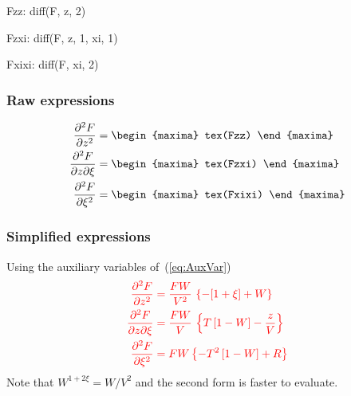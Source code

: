 \begin{maxima}
 Fzz: diff(F, z, 2)
\end{maxima}%

\begin{maxima}
  Fzxi: diff(F, z, 1, xi, 1)
\end{maxima}%

\begin{maxima}
  Fxixi: diff(F, xi, 2) 
\end{maxima}

\begin{landscape}
\subsubsection*{Raw expressions}
  \color{MonVertF}
\begin{align*}
  \frac{\partial^2 F}{\partial z^2}
  &=
    \begin{maxima}
       tex(Fzz)
     \end{maxima} \\
  \frac{\partial^2 F}{\partial z \partial \xi}
  &=
    \begin{maxima}
      tex(Fzxi)
    \end{maxima} \\
  \frac{\partial^2 F}{\partial \xi^2}
  &=
    \begin{maxima}
       tex(Fxixi)
    \end{maxima} \\
\end{align*}
\end{landscape}


\subsubsection*{Simplified expressions}

Using the auxiliary variables of~(\ref{eq:AuxVar})
\begin{equation}
  \color{red}
  \begin{aligned}
    \frac{\partial^2 F}{\partial z^2}
    &= \frac{F W}{V^2} \,\left\{-[1 + \xi]  + W \right\} \\
    \frac{\partial^2 F}{\partial z \partial \xi}
    &= \frac{F W}{V}  \, \left\{ T \left[1 - W \right]
      - \frac{z}{V} \right\}\\
    \frac{\partial^2 F}{\partial \xi^2}
    &= F W \left\{ - T^2 \left[1 - W \right] + R \right\}
  \end{aligned}
\end{equation}
Note that $W^{1+ 2\xi}= W/V^2$ and the second form is faster to
evaluate.

